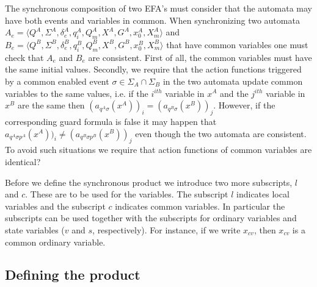 \documentclass{article}
\begin{document}
The synchronous composition of two EFA's must consider that the automata
may have both events and variables in common. When synchronizing two automata
$A_e=\langle Q^A, \Sigma^A, \delta^A_e, q^A_i, Q^A_m,
X^A, G^{A}, x^{A}_0, X^{A}_m \rangle$ and $B_e=\langle Q^B, \Sigma^B,
\delta^B_e, q^B_i, Q^B_m, X^B, G^{B}, x^{B}_0, X^{B}_m \rangle$ that have
common variables one must check that $A_e$ and $B_e$ are
consistent. First of all, the common variables must have the same
initial values. Secondly, we require that the action functions
triggered by a common enabled event $\sigma\in \Sigma_{A}\cap
\Sigma_{B}$ in the two automata update common variables to the
same values, i.e. if the $i^{ith}$ variable in $x^{A}$ and the
$j^{ith}$ variable in $x^{B}$ are the same then $(a_{q^A \sigma}(x^{A}))_i = (a_{q^B
\sigma}(x^{B}))_j$. However, if the corresponding guard
formula is false it may happen that $a_{q^A \sigma p^A}(x^{A}))_i \neq (a_{q^B
\sigma p^B}(x^{B}))_j$ even though the two automata are consistent.
To avoid such situations we require that action functions of common
variables are identical?

Before we define the synchronous product we introduce two more
subscripts, $l$ and $c$. These are to be used for the variables.
The subscript $l$ indicates local variables and the subscript $c$
indicates common variables. In particular the subscripts can be
used together with the subscripts for ordinary variables and state
variables ($v$  and $s$, respectively). For instance, if we write
$x_{cv}$, then $x_{cv}$ is a common ordinary variable.

\subsection{Defining the product}\label{defining the product}
\end{document}
